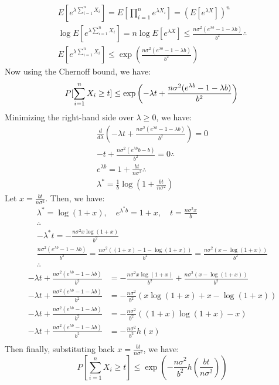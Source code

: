 \documentclass[11pt,a4paper,margin=1in]{article}
\begin{document}
\begin{enumerate}[(a)]
\begin{gather*}
        E[e^{\lambda \sum_{i=1}^n X_i}] = E\left[\prod_{i=1}^n e^{\lambda X_i}\right] = (E[e^{\lambda X}])^n \\
        \log E[e^{\lambda \sum_{i=1}^n X_i}] = n \log E[e^{\lambda X}] \leq \frac{n\sigma^2(e^{\lambda b} - 1 - \lambda b)}{b^2} \therefore \\
        E[e^{\lambda \sum_{i=1}^n X_i}] \leq \exp\left(\frac{n\sigma^2(e^{\lambda b} - 1 - \lambda b)}{b^2}\right)
    \end{gather*}
    Now using the Chernoff bound, we have:
    \[
        P[\sum_{i=1}^n X_i \geq t] \leq \exp\left(-\lambda t + \frac{n\sigma^2(e^{\lambda b} - 1 - \lambda b)}{b^2}\right) \\
    \]
    Minimizing the right-hand side over $\lambda \geq 0$, we have:
    \begin{gather*}
        \frac{d}{d\lambda} \left(-\lambda t + \frac{n\sigma^2(e^{\lambda b} - 1 - \lambda b)}{b^2}\right) = 0 \\
        -t + \frac{n\sigma^2(e^{\lambda b}b - b)}{b^2} = 0 \therefore \\
        e^{\lambda b} = 1 + \frac{bt}{n\sigma^2} \therefore \\
        \lambda^* = \frac{1}{b}\log\left(1 + \frac{bt}{n\sigma^2}\right)
    \end{gather*}
    Let $x = \frac{bt}{n\sigma^2}$. Then, we have:
    \begin{gather*}
        \lambda^* = \log(1 + x), \quad e^{\lambda^* b} = 1 + x, \quad t = \frac{n\sigma^2 x}{b} \\
        \therefore \\
        -\lambda^* t = -\frac{n\sigma^2 x \log(1+x)}{b^2} \\
        \frac{n\sigma^2(e^{\lambda b} - 1 - \lambda b)}{b^2} = \frac{n\sigma^2((1+x) - 1 - \log(1+x))}{b^2} = \frac{n\sigma^2(x - \log(1+x))}{b^2} \\
        \therefore
    \end{gather*}
    \begin{align*}
        -\lambda t + \frac{n\sigma^2(e^{\lambda b} - 1 - \lambda b)}{b^2} &= -\frac{n\sigma^2 x \log(1+x)}{b^2} + \frac{n\sigma^2(x - \log(1+x))}{b^2} \\
        -\lambda t + \frac{n\sigma^2(e^{\lambda b} - 1 - \lambda b)}{b^2} &= -\frac{n\sigma^2}{b^2}(x\log(1 + x) + x - \log(1 + x)) \\
        -\lambda t + \frac{n\sigma^2(e^{\lambda b} - 1 - \lambda b)}{b^2} &= -\frac{n\sigma^2}{b^2}((1+x)\log(1+x) - x) \\
        -\lambda t + \frac{n\sigma^2(e^{\lambda b} - 1 - \lambda b)}{b^2} &= -\frac{n\sigma^2}{b^2} h(x) \\
    \end{align*}
    Then finally, substituting back $x = \frac{bt}{n\sigma^2}$, we have:
    \[
        P\left[\sum_{i=1}^n X_i \geq t\right] \leq \exp\left(-\frac{n\sigma^2}{b^2} h\left(\frac{bt}{n\sigma^2}\right)\right)
    \]
\end{enumerate}
\end{document}
